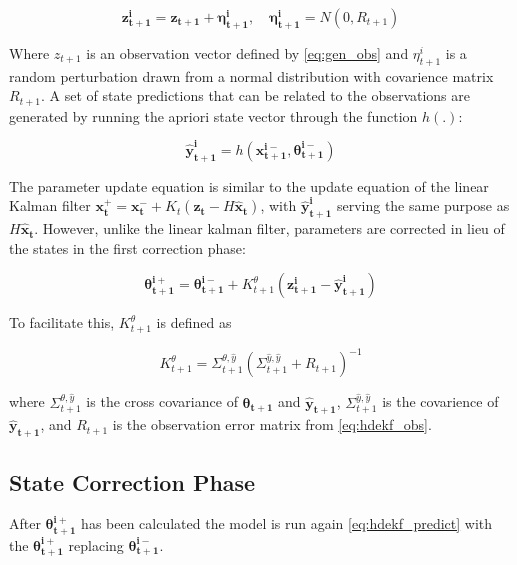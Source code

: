 \begin{equation}\label{eq:hdekf_obs}
\mathbf{z_{t+1}^{i}} = \mathbf{z_{t+1}} + \mathbf{\eta_{t+1}^{i}},\quad \mathbf{\eta_{t+1}^{i}} = N(0,R_{t+1})
\end{equation}

Where $z_{t+1}$ is an observation vector defined by \eqref{eq:gen_obs} and $\eta_{t+1}^{i}$ is a random perturbation drawn from a normal distribution with covarience matrix $R_{t+1}$. A set of state predictions that can be related to the observations are generated by running the apriori state vector through the function $h(.)$:

\begin{equation}\label{eq:hdekf_pred}
\mathbf{\hat{y}_{t+1}^{i}} = h(\mathbf{x_{t+1}^{i-}}, \mathbf{\theta_{t+1}^{i-}})
\end{equation}

The parameter update equation is similar to the update equation of the linear Kalman filter $\mathbf{x^{+}_{t}} = \mathbf{x^{-}_{t}} + K_{t}(\mathbf{z_{t}}-H\mathbf{\hat{x}_{t}})$, with $\mathbf{\hat{y}_{t+1}^{i}}$ serving the same purpose as $H\mathbf{\hat{x}_{t}}$. However, unlike the linear kalman filter,  parameters are corrected in lieu of the states in the first correction phase:

\begin{equation}\label{eq:hdekf_param_update}
\mathbf{\theta_{t+1}^{i+}} = \mathbf{\theta_{t+1}^{i-}} + K_{t+1}^{\theta}(\mathbf{z_{t+1}^{i}}-\mathbf{\hat{y}_{t+1}^{i}})
\end{equation}

To facilitate this, $K_{t+1}^{\theta}$ is defined as

\begin{equation}\label{eq:hdekf_param_k}
K_{t+1}^{\theta} = \Sigma^{\theta,\hat{y}}_{t+1}(\Sigma^{\hat{y},\hat{y}}_{t+1} + R_{t+1})^{-1}
\end{equation}

where $\Sigma^{\theta,\hat{y}}_{t+1}$ is the cross covariance of $\mathbf{\theta_{t+1}}$ and $\mathbf{\hat{y}_{t+1}}$, $\Sigma^{\hat{y},\hat{y}}_{t+1}$ is the covarience of $\mathbf{\hat{y}_{t+1}}$, and $R_{t+1}$ is the observation error matrix from \eqref{eq:hdekf_obs}. 

\subsection{State Correction Phase}

After $\mathbf{\theta_{t+1}^{i+}}$ has been calculated the model is run again \eqref{eq:hdekf_predict} with the $\mathbf{\theta_{t+1}^{i+}}$ replacing $\mathbf{\theta_{t+1}^{i-}}$.

